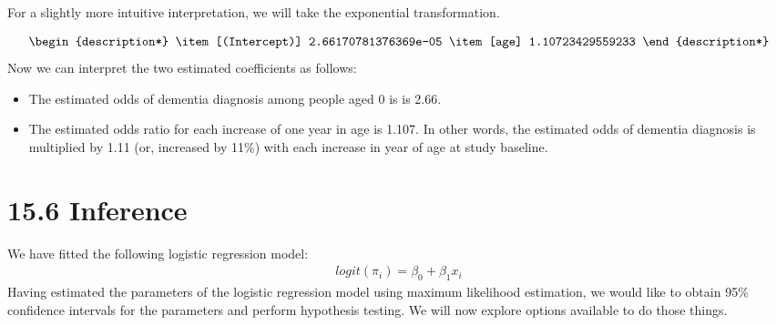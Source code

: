 \documentclass[letterpaper,10pt,english]{jupyterBook}
\begin{document}
\sphinxAtStartPar
For a slightly more intuitive interpretation, we will take the exponential transformation.

\begin{sphinxVerbatim}[commandchars=\\\{\}]
\end{sphinxVerbatim}
\begin{equation*}
\begin{split}\begin{description*}
\item[(Intercept)] 2.66170781376369e-05
\item[age] 1.10723429559233
\end{description*}\end{split}
\end{equation*}
\sphinxAtStartPar
Now we can interpret the two estimated coefficients as follows:
\begin{itemize}
\item {} 
\sphinxAtStartPar
The estimated odds of dementia diagnosis among people aged 0 is is 2.66.

\item {} 
\sphinxAtStartPar
The estimated odds ratio for each increase of one year in age is 1.107. In other words, the estimated odds of dementia diagnosis is multiplied by 1.11 (or, increased by 11\%) with each increase in year of age at study baseline.

\end{itemize}


\section{15.6 Inference}
\label{\detokenize{15.g. Logistic Regression:inference}}\label{\detokenize{15.g. Logistic Regression::doc}}
\sphinxAtStartPar
We have fitted the following logistic regression model:
\begin{equation*}
\begin{split}
logit(\pi_i) = \beta_0 + \beta_1 x_i 
\end{split}
\end{equation*}
\sphinxAtStartPar
Having estimated the parameters of the logistic regression model using maximum likelihood estimation, we would like to obtain 95\% confidence intervals for the parameters and perform hypothesis testing. We will now explore options available to do those things.
\end{document}
